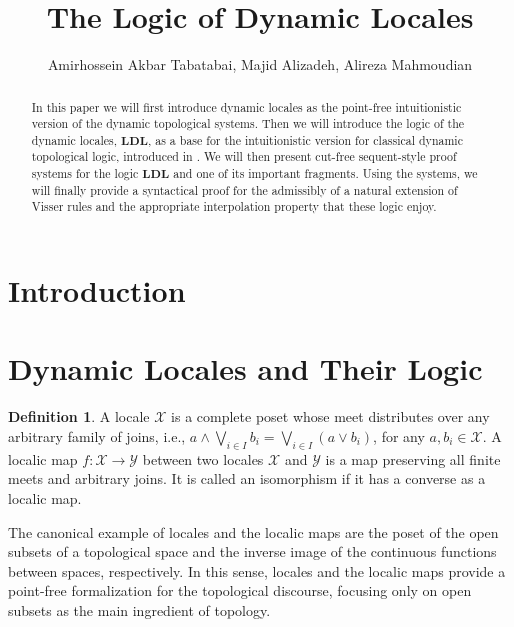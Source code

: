 \documentclass[12pt,a4paper]{article}
\theoremstyle{plain}
\theoremstyle{definition}
\newtheorem{dfn}[thm]{Definition}
\begin{document}
\title{The Logic of Dynamic Locales}


\author[]{Amirhossein Akbar Tabatabai, Majid Alizadeh, Alireza Mahmoudian}

\affil[]{ }


\date{ }

\maketitle


\begin{abstract}
In this paper we will first introduce dynamic locales as the point-free intuitionistic version of the dynamic topological systems. Then we will introduce the logic of the dynamic locales, $\mathbf{LDL}$, as a base for the intuitionistic version for classical dynamic topological logic, introduced in \cite{Artemov}. We will then present cut-free sequent-style proof systems for the logic $\mathbf{LDL}$ and one of its important fragments. Using the systems, we will finally provide a syntactical proof for the admissibly of a natural extension of Visser rules and the appropriate interpolation property that these logic enjoy.
\end{abstract}

\section{Introduction}


\section{Dynamic Locales and Their Logic} \label{DynamicLocales}

\begin{dfn}
A locale $\mathscr{X}$ is a complete poset whose meet distributes over any arbitrary family of joins, i.e., $a \wedge \bigvee_{i \in I} b_i=\bigvee_{i \in I} (a \vee b_i)$, for any $a, b_i \in \mathscr{X}$. A localic map $f: \mathscr{X} \to \mathscr{Y}$ between two locales $\mathscr{X}$ and $\mathscr{Y}$ is a map preserving all finite meets and arbitrary joins. It is called an isomorphism if it has a converse as a localic map.
\end{dfn}

The canonical example of locales and the localic maps are the poset of the open subsets of a topological space and the inverse image of the continuous functions between spaces, respectively. In this sense, locales and the localic maps provide a point-free formalization for the topological discourse, focusing only on open subsets as the main ingredient of topology.
\end{document}
